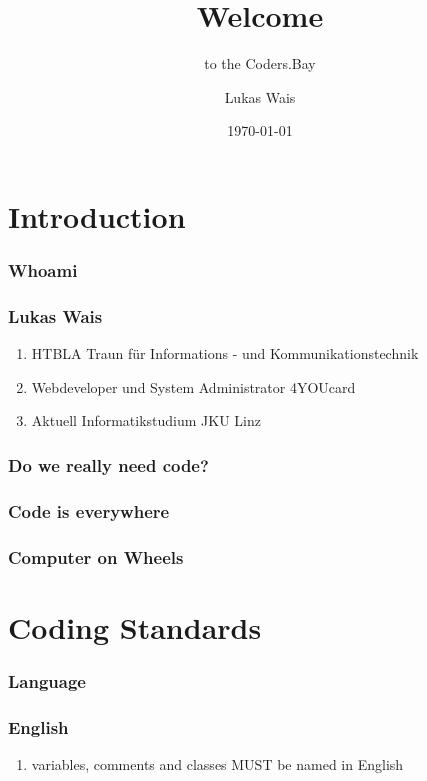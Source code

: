 \documentclass[aspectratio=169]{beamer}
\title{Welcome}
\subtitle{to the Coders.Bay}
\author{Lukas Wais}
\date{\today}
\begin{document}
\frame{\titlepage}
\frame{\tableofcontents}
\section{Introduction}
\subsubsection{Whoami}
\begin{frame}
  \frametitle{Lukas Wais}
  \begin{enumerate}
    \item HTBLA Traun für Informations - und Kommunikationstechnik
    \item Webdeveloper und System Administrator 4YOUcard
    \item Aktuell Informatikstudium JKU Linz
  \end{enumerate}
\end{frame}

\subsubsection{Do we really need code?}
\begin{frame}
  \frametitle{Code is everywhere}
\end{frame}

\begin{frame}
  \frametitle{Computer on Wheels}
\end{frame}

\section{Coding Standards}
\subsubsection{Language}
\begin{frame}
  \frametitle{English}

  \begin{enumerate}
    \item variables, comments and classes MUST be named in English
  \end{enumerate}
\end{frame}
\end{document}
